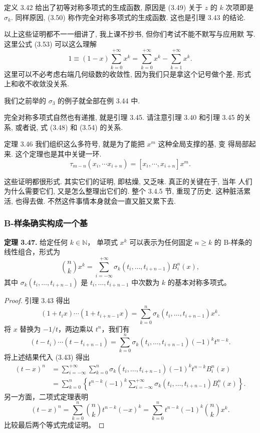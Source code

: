 \documentclass[a4paper]{ctexart}
\begin{document}
{定义 3.42 给出了初等对称多项式的生成函数, 原因是 (3.49) 关于 $z$ 的
$k$ 次项即是 $\sigma_k$. 同样原因, (3.50) 称作完全对称多项式的生成函数.
这也是引理 3.43 的结论.

以上这些证明都不一一细讲了, 我上课不抄书, 但你们考试不能不默写与应用默
写. 这里公式 (3.53) 可以这么理解
$$
1 \equiv (1 - x)\sum_{k = 0}^{+\infty} x^k = \sum_{k =
  0}^{+\infty}x^k - \sum_{k = 1}^{+\infty} x^k.
$$
这里可以不必考虑右端几何级数的收敛性, 因为我们只是拿这个记号做个差,
形式上和收不收敛没关系.

我们之前举的 $\sigma_3$ 的例子就全部在例 3.44 中.

完全对称多项式自然也有递推, 就是引理 3.45. 请注意引理 3.40 和引理 3.45 的关系, 或者说,
式 (3.48) 和 (3.54) 的关系.

定理 3.46 我们组织这么多符号, 就是为了能把 $x^m$ 这种全局支撑的基, 变
得局部起来. 这个定理也是其中关键一环.
$$
\tau_{m - n}(x_i, \cdots x_{i + n}) = [x_i, \cdots, x_{i + n}] x^m.
$$

这些证明都很形式. 其实它们的证明, 即枯燥, 又乏味. 真正的关键在于, 当年
人们为什么需要它们, 又是怎么整理出它们的. 整个 3.4.5 节, 重现了历史.
这种脏活累活, 也得去做. 不然这件事情本身就会一直又脏又累下去.

\subsubsection{B-样条确实构成一个基}

\noindent\textbf{定理 3.47.} 给定任何 $k \in \mathbb{N}$，
单项式 $x^{k}$ 可以表示为任何固定 $n \geq k$ 的 B-样条的线性组合，形式为
\[
\binom{n}{k} x^k 
= \sum_{i=-\infty}^{+\infty} 
\sigma_k(t_i, \ldots, t_{i+n-1}) B_i^n(x), \tag{3.58}
\]
其中 $\sigma_{k}(t_{i}, \ldots, t_{i+n-1})$ 是 
$t_{i}, \ldots, t_{i+n-1}$ 中次数为 $k$ 的基本对称多项式。

\begin{proof}
  引理 3.43 得出
  \[
  (1 + t_i x) \cdots (1 + t_{i+n-1} x) = \sum_{k=0}^n \sigma_k(t_i, \ldots, t_{i+n-1}) x^k.
  \]
  将 $x$ 替换为 $-1/t$，两边乘以 $t^{n}$，我们有
  \[
  (t - t_i) \cdots (t - t_{i+n-1}) = \sum_{k=0}^n \sigma_k(t_i, \ldots, t_{i+n-1})(-1)^k t^{n-k}.
  \]
  将上述结果代入 (3.43) 得出
  \begin{align*}
  (t - x)^n &= \sum_{i=-\infty}^{+\infty} \sum_{k=0}^n \sigma_k(t_i, \ldots, t_{i+n-1})(-1)^k t^{n-k} B_i^n(x) \\
  &= \sum_{k=0}^n \left\{ t^{n-k} (-1)^k \sum_{i=-\infty}^{+\infty} \sigma_k(t_i, \ldots, t_{i+n-1}) B_i^n(x) \right\}.
  \end{align*}
  另一方面，二项式定理表明
  \[
  (t - x)^n = \sum_{k=0}^n \binom{n}{k} t^{n-k} (-x)^k = \sum_{k=0}^n t^{n-k} (-1)^k \binom{n}{k} x^k.
  \]
  比较最后两个等式完成证明。
\end{proof}

}
\end{document}
